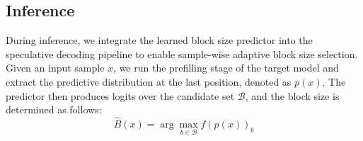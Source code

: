\documentclass{llmxive}
\providecommand{\arraystretch}{1.15}
\begin{document}
\subsection{Inference}



\begin{table}[t]
\vspace{-8pt}
\centering
\small
\setlength{\tabcolsep}{3.2pt} 
\renewcommand{\arraystretch}{1.15}
\vspace{-8pt}

\caption{Overhead analysis of the block size predictor compared to backbone models.}
\label{tab:model_efficiency}
\end{table}
During inference, we integrate the learned block size predictor into the speculative decoding pipeline to enable sample-wise adaptive block size selection. Given an input sample $x$, we run the prefilling stage of the target model and extract the predictive distribution at the last position, denoted as $p(x)$. The predictor then produces logits over the candidate set $\mathcal{B}$, and the block size is determined as follows:
\begin{equation}
\hat{B}(x) = \arg\max_{b \in \mathcal{B}} f(p(x))_b
\end{equation}
\end{document}
